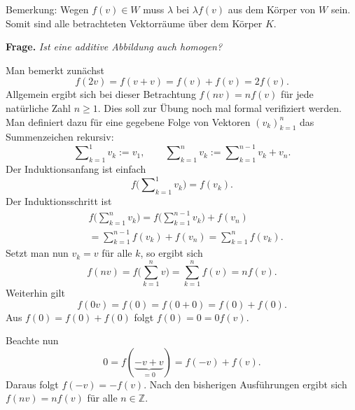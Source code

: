 \documentclass[a4paper,11pt,fleqn,twoside]{scrartcl}
\numberwithin{equation}{section}
\newcommand{\Z}{\mathbb Z}
\newcommand{\strong}[1]{{\normalfont\sffamily\bfseries #1}}
\theoremstyle{rmbox}
\begin{document}
Bemerkung: Wegen $f(v)\in W$ muss $\lambda$ bei $\lambda f(v)$ aus
dem Körper von $W$ sein. Somit sind alle betrachteten Vektorräume
über dem Körper $K$.

\strong{Frage.} \emph{Ist eine additive Abbildung auch homogen?}

Man bemerkt zunächst
\begin{equation}
f(2v) = f(v+v) = f(v)+f(v) = 2f(v).
\end{equation}
Allgemein ergibt sich bei dieser Betrachtung $f(nv) = nf(v)$ für jede
natürliche Zahl $n\ge 1$. Dies soll zur Übung noch mal formal
verifiziert werden. Man definiert dazu für eine gegebene Folge
von Vektoren $(v_k)_{k=1}^n$ das Summenzeichen rekursiv:
\begin{equation}
\sum\nolimits_{k=1}^1 v_k := v_1,\qquad
\sum\nolimits_{k=1}^n v_k := \sum\nolimits_{k=1}^{n-1} v_k+v_n.
\end{equation}
Der Induktionsanfang ist einfach
\begin{equation}
f\Big(\sum\nolimits_{k=1}^1 v_k\Big) = f(v_k).
\end{equation}
Der Induktionsschritt ist
\begin{equation}
\begin{split}
&f\Big(\sum\nolimits_{k=1}^n v_k\Big)
= f\Big(\sum\nolimits_{k=1}^{n-1} v_k\Big)+f(v_n)\\
&=\sum\nolimits_{k=1}^{n-1} f(v_k)+f(v_n)
= \sum\nolimits_{k=1}^n f(v_k).
\end{split}
\end{equation}
Setzt man nun $v_k=v$ für alle $k$, so ergibt sich
\begin{equation}
f(nv) = f\bigg(\sum_{k=1}^n v\bigg) = \sum_{k=1}^n f(v) = nf(v).
\end{equation}
Weiterhin gilt
\begin{equation}
f(0v) = f(0) = f(0+0) = f(0) + f(0).
\end{equation}
Aus $f(0)=f(0)+f(0)$ folgt $f(0)=0=0f(v)$.

Beachte nun
\begin{equation}
0 = f(\underbrace{-v+v}_{=0}) = f(-v)+f(v).
\end{equation}
Daraus folgt $f(-v) = -f(v)$.
Nach den bisherigen Ausführungen ergibt sich $f(nv) = nf(v)$ für alle
$n\in\Z$.
\end{document}
